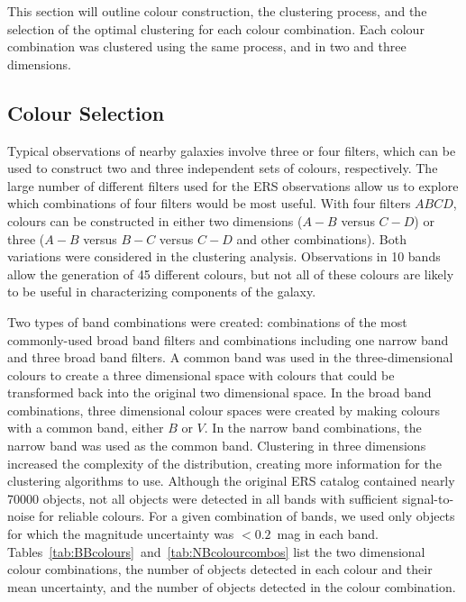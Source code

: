 This section will outline colour construction, the clustering process, and the selection of the optimal clustering for each colour combination.
Each colour combination was clustered using the same process, and in two and three dimensions.


\subsection{Colour Selection}

Typical observations of nearby galaxies involve three or four filters, %
which can be used to construct two and three independent sets of colours, respectively. %
The large number of different filters used for the ERS observations allow us to explore which combinations of four filters would be most useful.
With four filters $ABCD$, colours can be constructed in either two dimensions ($A-B$ versus $C-D$) or three ($A-B$ versus $B-C$ versus $C-D$ and other combinations).
Both variations were considered in the clustering analysis.
Observations in 10 bands allow the generation of 45 different colours, but not all of these colours are likely to be useful in characterizing components of the galaxy.

Two types of band combinations were created: combinations of the most commonly-used broad band filters and combinations including one narrow band and three broad band filters.
A common band was used in the three-dimensional colours to create a three dimensional space with colours that could be transformed back into the original two dimensional space. 
In the broad band combinations, three dimensional colour spaces were created by making colours with a common band, either $B$ or $V$.
In the narrow band combinations, the narrow band was used as the common band.
Clustering in three dimensions increased the complexity of the distribution, creating more information for the clustering algorithms to use. %
Although the original ERS catalog contained nearly 70000 objects, not all objects were detected in all bands with sufficient signal-to-noise for reliable colours. 
For a given combination of bands, we used only objects for which the magnitude uncertainty was $<0.2$~mag in each band.
Tables~\ref{tab:BBcolours}~and~\ref{tab:NBcolourcombos} list the two dimensional colour combinations, the number of objects detected in each colour and their mean uncertainty, and the number of objects detected in the colour combination.


